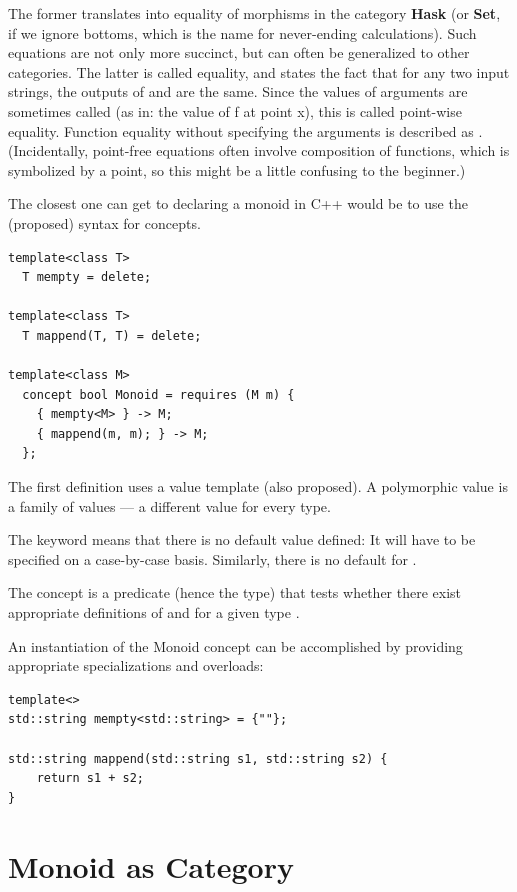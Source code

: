 The former translates into equality of morphisms in the category
\textbf{Hask} (or \textbf{Set}, if we ignore bottoms, which is the name
for never-ending calculations). Such equations are not only more
succinct, but can often be generalized to other categories. The latter
is called  equality, and states the fact that for any
two input strings, the outputs of  and \code{(++)} are
the same. Since the values of arguments are sometimes called
 (as in: the value of f at point x), this is called
point-wise equality. Function equality without specifying the arguments
is described as . (Incidentally, point-free equations
often involve composition of functions, which is symbolized by a point,
so this might be a little confusing to the beginner.)

The closest one can get to declaring a monoid in C++ would be to use the
(proposed) syntax for concepts.

\begin{verbatim}
template<class T>
  T mempty = delete;
  
template<class T>
  T mappend(T, T) = delete;
  
template<class M> 
  concept bool Monoid = requires (M m) { 
    { mempty<M> } -> M; 
    { mappend(m, m); } -> M;
  };
\end{verbatim}


The first definition uses a value template (also proposed). A
polymorphic value is a family of values --- a different value for every
type.

The keyword  means that there is no default value
defined: It will have to be specified on a case-by-case basis.
Similarly, there is no default for .

The concept  is a predicate (hence the 
type) that tests whether there exist appropriate definitions of
 and  for a given type .

An instantiation of the Monoid concept can be accomplished by providing
appropriate specializations and overloads:

\begin{verbatim}
template<>
std::string mempty<std::string> = {""};

std::string mappend(std::string s1, std::string s2) { 
    return s1 + s2;
}
\end{verbatim}

\section{Monoid as Category}\label{monoid-as-category}

